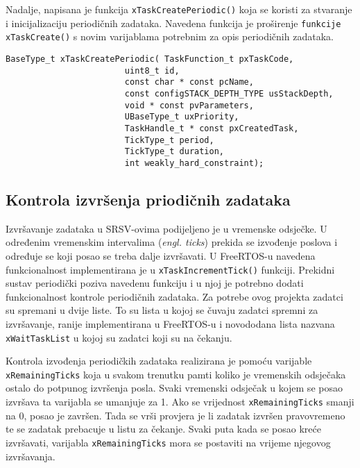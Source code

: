 \documentclass[../zavrsni.tex]{subfiles}
\begin{document}
Nadalje, napisana je funkcija \texttt{xTaskCreatePeriodic()} koja se koristi za stvaranje i inicijalizaciju periodičnih zadataka.
Navedena funkcija je proširenje \texttt{funkcije xTaskCreate()} s novim varijablama potrebnim za opis periodičnih zadataka.

\begin{lstlisting}[style=CStyle,caption={Prototip funkcije \texttt{xTaskCreatePeriodic()}},captionpos=b]
BaseType_t xTaskCreatePeriodic( TaskFunction_t pxTaskCode,
                        uint8_t id,
                        const char * const pcName, 
                        const configSTACK_DEPTH_TYPE usStackDepth,
                        void * const pvParameters,
                        UBaseType_t uxPriority,
                        TaskHandle_t * const pxCreatedTask,
                        TickType_t period,
                        TickType_t duration,
                        int weakly_hard_constraint);
\end{lstlisting} 

\subsection{Kontrola izvršenja priodičnih zadataka}

Izvršavanje zadataka u SRSV-ovima podijeljeno je u vremenske odsječke. U određenim vremenskim intervalima (\textit{engl. ticks}) prekida se izvođenje poslova i 
određuje se koji posao se treba dalje izvršavati.
U FreeRTOS-u navedena funkcionalnost implementirana je u \texttt{xTaskIncrementTick()} funkciji. Prekidni sustav periodički poziva navedenu funkciju 
i u njoj je potrebno dodati funkcionalnost kontrole periodičnih zadataka.
Za potrebe ovog projekta zadatci su spremani u dvije liste. To su lista u kojoj se čuvaju zadatci spremni za izvršavanje, ranije 
implementirana u FreeRTOS-u i novododana lista nazvana \texttt{xWaitTaskList} u kojoj su zadatci koji su na čekanju. 

Kontrola izvođenja periodičkih zadataka realizirana je pomoću varijable \texttt{xRemainingTicks} koja u svakom trenutku pamti 
koliko je vremenskih odsječaka ostalo do potpunog izvršenja posla.
Svaki vremenski odsječak u kojem se posao izvršava ta varijabla se umanjuje za 1. Ako se vrijednost \texttt{xRemainingTicks} smanji na 0, 
posao je završen. Tada se vrši provjera je li zadatak izvršen pravovremeno te se zadatak prebacuje u listu za čekanje.
Svaki puta kada se posao kreće izvršavati, varijabla \texttt{xRemainingTicks} mora se postaviti na vrijeme njegovog izvršavanja.
\end{document}
